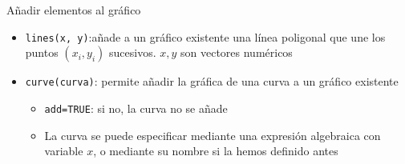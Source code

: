 \documentclass[
  ignorenonframetext,
  aspectratio=169]{beamer}
\providecommand{\tightlist}{%
  \setlength{\itemsep}{0pt}\setlength{\parskip}{0pt}}
\begin{document}
\begin{frame}[fragile]{Añadir elementos al gráfico}
\protect\hypertarget{auxf1adir-elementos-al-gruxe1fico-2}{}
\begin{itemize}
\tightlist
\item
  \texttt{lines(x,\ y)}:añade a un gráfico existente una línea poligonal
  que une los puntos \((x_i, y_i)\) sucesivos. \(x,y\) son vectores
  numéricos
\item
  \texttt{curve(curva)}: permite añadir la gráfica de una curva a un
  gráfico existente

  \begin{itemize}
  \tightlist
  \item
    \texttt{add=TRUE}: si no, la curva no se añade
  \item
    La curva se puede especificar mediante una expresión algebraica con
    variable \(x\), o mediante su nombre si la hemos definido antes
  \end{itemize}
\end{itemize}
\end{frame}
\end{document}
